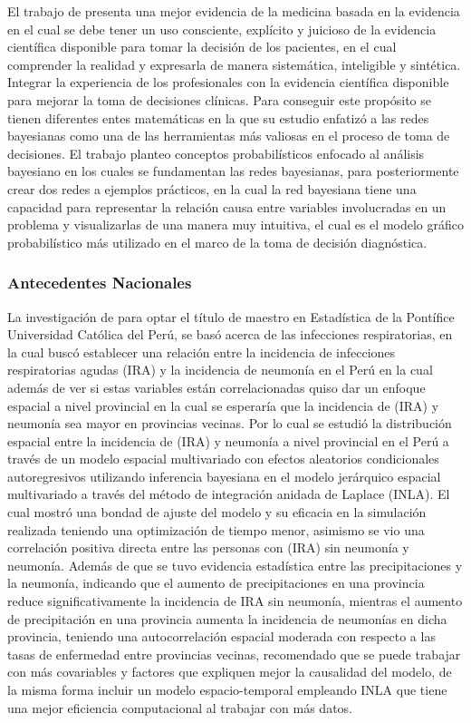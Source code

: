 El trabajo de \textcite{ferez2017redes} presenta una mejor evidencia de la medicina basada en la evidencia en el cual se debe tener un uso consciente, explícito y juicioso de la evidencia científica disponible para tomar la decisión de los pacientes, en el cual comprender la realidad y expresarla de manera sistemática, inteligible y sintética. Integrar la experiencia de los profesionales con la evidencia científica disponible para mejorar la toma de decisiones clínicas. Para conseguir este propósito se tienen diferentes entes matemáticas en la que su estudio enfatizó a las redes bayesianas como una de las herramientas más valiosas en el proceso de toma de decisiones. El trabajo planteo conceptos probabilísticos enfocado al análisis bayesiano en los cuales se fundamentan las redes bayesianas, para posteriormente crear dos redes a ejemplos prácticos, en la cual la red bayesiana tiene una capacidad para representar la relación causa entre variables involucradas en un problema y visualizarlas de una manera muy intuitiva, el cual es el modelo gráfico probabilístico más utilizado en el marco de la toma de decisión diagnóstica.

\subsubsection{Antecedentes Nacionales}
La investigación de \textcite{lopezmodelamiento} para optar el título de maestro en Estadística de la Pontífice Universidad Católica del Perú, se basó acerca de las infecciones respiratorias, en la cual buscó establecer una relación entre la incidencia de infecciones respiratorias agudas (IRA) y la incidencia de neumonía en el Perú en la cual además de ver si estas variables están correlacionadas quiso dar un enfoque espacial a nivel provincial en la cual se esperaría que la incidencia de (IRA) y neumonía sea mayor en provincias vecinas. Por lo cual se estudió la distribución espacial entre la incidencia de (IRA) y neumonía a nivel provincial en el Perú a través de un modelo espacial multivariado con efectos aleatorios condicionales autoregresivos utilizando inferencia bayesiana en el modelo jerárquico espacial multivariado a través del método de integración anidada de Laplace (INLA). El cual mostró una bondad de ajuste del modelo y su eficacia en la simulación realizada teniendo una optimización de tiempo menor, asimismo se vio una correlación positiva directa entre las personas con (IRA) sin neumonía y neumonía. Además de que se tuvo evidencia estadística entre las precipitaciones y la neumonía, indicando que el aumento de precipitaciones en una provincia reduce significativamente la incidencia de IRA sin neumonía, mientras el aumento de precipitación en una provincia aumenta la incidencia de neumonías en dicha provincia, teniendo una autocorrelación espacial moderada con respecto a las tasas de enfermedad entre provincias vecinas, recomendado que se puede trabajar con más covariables y factores que expliquen mejor la causalidad del modelo, de la misma forma incluir un modelo espacio-temporal empleando INLA que tiene una mejor eficiencia computacional al trabajar con más datos.

